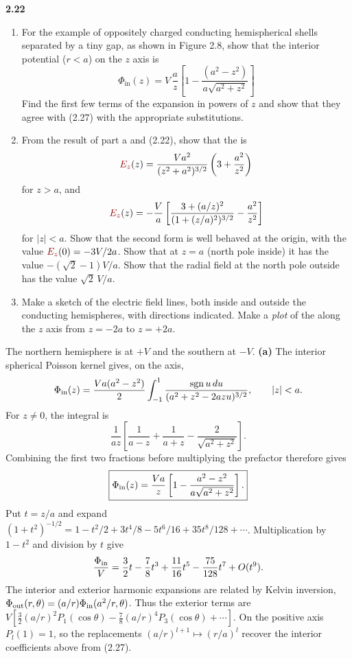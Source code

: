\par\bigskip
\noindent\textbf{2.22}\quad\begin{enumerate}
\item[(a)] For the example of oppositely charged conducting hemispherical shells separated by a tiny gap, as shown in Figure 2.8, show that the interior potential ($r<a$) on the $z$ axis is
\[
\Phi_{\mathrm{in}}(z)=V\,\frac{a}{z}\left[1-\frac{(a^{2}-z^{2})}{a\sqrt{a^{2}+z^{2}}}\right]
\]
Find the first few terms of the expansion in powers of $z$ and show that they agree with (2.27) with the appropriate substitutions.
\item[(b)] From the result of part a and (2.22), show that the  is
\[
\erratum{E_{z}}(z)=\frac{Va^{2}}{(z^{2}+a^{2})^{3/2}}\left(3+\frac{a^{2}}{z^{2}}\right)
\]
for $z>a$, and
\[
\erratum{E_{z}}(z)=-\frac{V}{a}\left[\frac{3+(a/z)^{2}}{(1+(z/a)^{2})^{3/2}}-\frac{a^{2}}{z^{2}}\right]
\]
for $|z|<a$. Show that the second form is well behaved at the origin, with the value $\erratum{E_{z}}(0)=-3V/2a$. Show that at $z=a$ (north pole inside) it has the value $-(\sqrt{2}-1)V/a$. Show that the radial field at the north pole outside has the value $\sqrt{2}\,V/a$.
\item[(c)] Make a sketch of the electric field lines, both inside and outside the conducting hemispheres, with directions indicated. Make a \emph{plot} of the  along the $z$ axis from $z=-2a$ to $z=+2a$.
\end{enumerate}
\solution
The northern hemisphere is at $+V$ and the southern at $-V$.
\textbf{(a)} The interior spherical Poisson kernel gives, on the axis,
\[
\Phi_{\rm in}(z)=\frac{Va(a^2-z^2)}2
 \int_{-1}^{1}\frac{\operatorname{sgn}u\,du}
                 {(a^2+z^2-2azu)^{3/2}},\qquad |z|<a.
\]
For $z\ne0$, the integral is
\[
\frac1{az}\left[\frac1{a-z}+\frac1{a+z}
                              -\frac2{\sqrt{a^2+z^2}}\right].
\]
Combining the first two fractions before multiplying the prefactor
therefore gives
\[
\boxed{\Phi_{\rm in}(z)=\frac{Va}{z}
 \left[1-\frac{a^2-z^2}{a\sqrt{a^2+z^2}}\right].}
\]
Put $t=z/a$ and expand
$(1+t^2)^{-1/2}=1-t^2/2+3t^4/8-5t^6/16+35t^8/128+\cdots$.
Multiplication by $1-t^2$ and division by $t$ give
\[
\frac{\Phi_{\rm in}}V=\frac32t-\frac78t^3+\frac{11}{16}t^5
                              -\frac{75}{128}t^7+O(t^9).
\]
The interior and exterior harmonic expansions are related by Kelvin
inversion,
$\Phi_{\rm out}(r,\theta)=(a/r)\Phi_{\rm in}(a^2/r,\theta)$.
Thus the exterior terms are
$V[\tfrac32(a/r)^2P_1(\cos\theta)
-\tfrac78(a/r)^4P_3(\cos\theta)+\cdots]$.
On the positive axis $P_l(1)=1$, so the replacements
$(a/r)^{l+1}\mapsto(r/a)^l$ recover the interior coefficients above
from (2.27).

